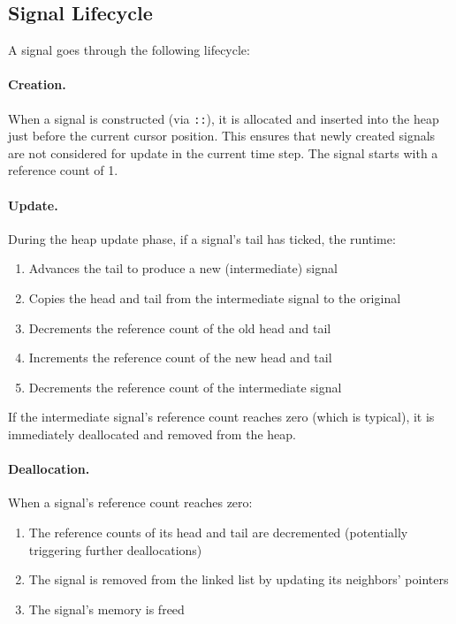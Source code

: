 \subsection{Signal Lifecycle}

A signal goes through the following lifecycle:

\paragraph{Creation.} When a signal is constructed (via \texttt{::}), it is allocated and inserted into the heap just before the current cursor position. This ensures that newly created signals are not considered for update in the current time step. The signal starts with a reference count of 1.

\paragraph{Update.} During the heap update phase, if a signal's tail has ticked, the runtime:
\begin{enumerate}
    \item Advances the tail to produce a new (intermediate) signal
    \item Copies the head and tail from the intermediate signal to the original
    \item Decrements the reference count of the old head and tail
    \item Increments the reference count of the new head and tail
    \item Decrements the reference count of the intermediate signal
\end{enumerate}

If the intermediate signal's reference count reaches zero (which is typical), it is immediately deallocated and removed from the heap.

\paragraph{Deallocation.} When a signal's reference count reaches zero:
\begin{enumerate}
    \item The reference counts of its head and tail are decremented (potentially triggering further deallocations)
    \item The signal is removed from the linked list by updating its neighbors' pointers
    \item The signal's memory is freed
\end{enumerate}

